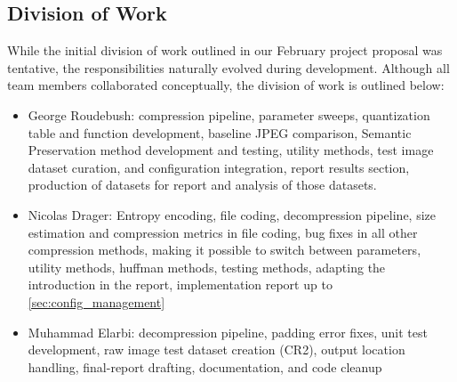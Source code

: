 \subsection{Division of Work}
\label{sec:division-of-work}

While the initial division of work outlined in our February project proposal was tentative, the responsibilities naturally evolved during development. Although all team members collaborated conceptually, the division of work is outlined below:
\begin{itemize}
  \item George Roudebush: compression pipeline, parameter sweeps, quantization table and function development, baseline JPEG comparison, Semantic Preservation method development and testing, utility methods, test image dataset curation, and configuration integration, report results section, production of datasets for report and analysis of those datasets.
  \item Nicolas Drager: Entropy encoding, file coding, decompression pipeline, size estimation and compression metrics in file coding, bug fixes in all other compression methods, making it possible to switch between parameters, utility methods, huffman methods, testing methods, adapting the introduction in the report, implementation report up to \ref{sec:config_management}
  \item Muhammad Elarbi: decompression pipeline, padding error fixes, unit test development, raw image test dataset creation (CR2), output location handling, final-report drafting, documentation, and code cleanup
\end{itemize}